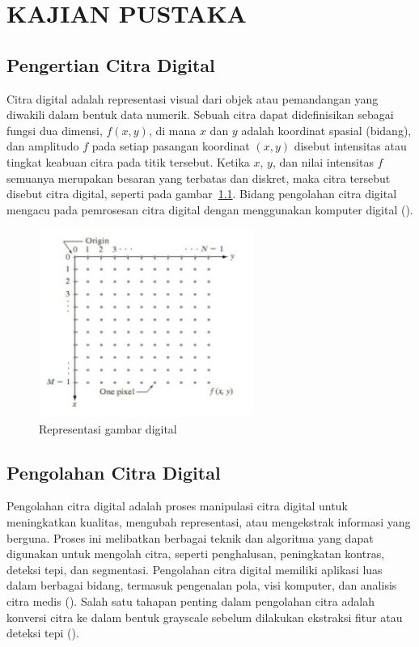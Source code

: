 
\chapter{KAJIAN PUSTAKA}

\section{Pengertian Citra Digital}
  Citra digital adalah representasi visual dari objek atau pemandangan yang diwakili dalam bentuk data numerik.
Sebuah citra dapat didefinisikan sebagai fungsi dua dimensi, \(f(x, y)\), di mana \(x\) dan \(y\) adalah koordinat spasial (bidang), dan amplitudo \(f\) pada setiap pasangan koordinat \((x, y)\) disebut intensitas atau tingkat keabuan citra pada titik tersebut. Ketika \(x\), \(y\), dan nilai intensitas \(f\) semuanya merupakan besaran yang terbatas dan diskret, maka citra tersebut disebut citra digital, seperti pada gambar~\ref{fig:spasial}. Bidang pengolahan citra digital mengacu pada pemrosesan citra digital dengan menggunakan komputer digital (\cite[hlm. 1--6]{Gonzalez2018}).
\begin{figure}
  \centering
    \includegraphics[keepaspectratio, width=7cm]{gambar/representing-digital-image-n.jpg}
    \caption{Representasi gambar digital}\label{fig:spasial}

\end{figure}
\section{Pengolahan Citra Digital}
  Pengolahan citra digital adalah proses manipulasi citra digital untuk meningkatkan kualitas, mengubah representasi, atau mengekstrak informasi yang berguna. Proses ini melibatkan berbagai teknik dan algoritma yang dapat digunakan untuk mengolah citra, seperti penghalusan, peningkatan kontras, deteksi tepi, dan segmentasi. Pengolahan citra digital memiliki aplikasi luas dalam berbagai bidang, termasuk pengenalan pola, visi komputer, dan analisis citra medis (\cite[hlm. 27--32]{Gonzalez2018}). 
  Salah satu tahapan penting dalam pengolahan citra adalah konversi citra ke dalam bentuk grayscale sebelum dilakukan ekstraksi fitur atau deteksi tepi (\cite[hlm. 307--308]{Sanchez2018}).

